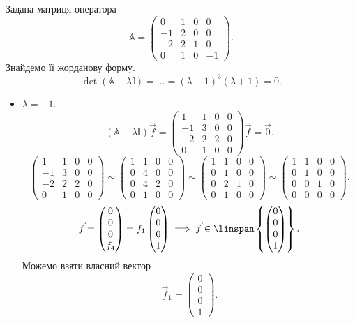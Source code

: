 \documentclass{math_library}
\begin{document}
\begin{example}
Задана матриця оператора 
\[
\mathbb{A} = \begin{pmatrix}
0 & 1 & 0 & 0 \\
-1 & 2 & 0 & 0 \\
-2 & 2 & 1 & 0 \\
0 & 1 & 0 & -1
\end{pmatrix}.
\]
Знайдемо її жорданову форму.
\[
\det(\mathbb{A}-\lambda \mathbb{I}) = \dots = (\lambda - 1)^3(\lambda + 1) = 0.
\]
\begin{itemize}[wide=0pt]
\item $\lambda = -1$.
\[
(\mathbb{A} - \lambda \mathbb{I}) \vec{f} = \begin{pmatrix}
1 & 1 & 0 & 0 \\
-1 & 3 & 0 & 0 \\
-2 & 2 & 2 & 0 \\
0 & 1 & 0 & 0
\end{pmatrix} \vec{f} = \vec{0}.
\]
\[
\begin{pmatrix}
1 & 1 & 0 & 0 \\
-1 & 3 & 0 & 0 \\
-2 & 2 & 2 & 0 \\
0 & 1 & 0 & 0
\end{pmatrix} \sim \begin{pmatrix}
1 & 1 & 0 & 0 \\
0 & 4 & 0 & 0 \\
0 & 4 & 2 & 0 \\
0 & 1 & 0 & 0
\end{pmatrix} \sim \begin{pmatrix}
1 & 1 & 0 & 0 \\
0 & 1 & 0 & 0 \\
0 & 2 & 1 & 0 \\
0 & 1 & 0 & 0
\end{pmatrix} \sim \begin{pmatrix}
1 & 1 & 0 & 0 \\
0 & 1 & 0 & 0 \\
0 & 0 & 1 & 0 \\
0 & 0 & 0 & 0
\end{pmatrix}.
\]
\[
\vec{f} = \begin{pmatrix}
0 \\ 0 \\ 0 \\ f_4
\end{pmatrix} = f_1 \begin{pmatrix}
0 \\ 0 \\ 0 \\ 1
\end{pmatrix} \implies \vec{f} \in \linspan \left\{ \begin{pmatrix}
0 \\ 0 \\ 0 \\ 1
\end{pmatrix} \right\}.
\]
Можемо взяти власний вектор 
\[
\vec{f}_1 = \begin{pmatrix}
0 \\ 0 \\ 0 \\ 1
\end{pmatrix}.
\]


\end{itemize}
\end{example}
\end{document}
